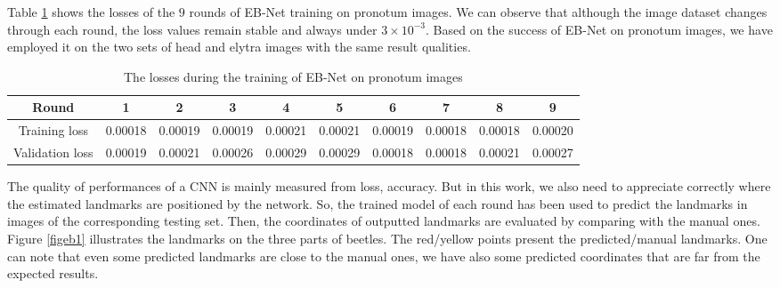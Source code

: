 \documentclass[review]{elsarticle}
\begin{document}
Table \ref{tbltrainingloss} shows the losses of the $9$ rounds of EB-Net training on pronotum images. We can observe that although the image dataset changes through each round, the loss values remain stable and always under $3 \times 10^{-3}$. Based on the success of EB-Net on pronotum images, we have employed it on the two sets of head and elytra images with the same result qualities.

\begin{table}[h!]
	\centering
	\begin{tabular}{| c | c | c | c | c | c | c | c | c | c |}
	\hline
	Round & 1 & 2 & 3 & 4 & 5 & 6 & 7 & 8 & 9 \\ \hline
Training loss & 0.00018 & 0.00019 & 0.00019 & 0.00021 & 0.00021 & 0.00019 & 0.00018 & 0.00018 & 0.00020 \\ \hline
Validation loss & 0.00019 & 0.00021 & 0.00026 & 0.00029 & 0.00029 & 0.00018 & 0.00018 & 0.00021 & 0.00027 \\ \hline
	\end{tabular}
	\caption{The losses during the training of EB-Net on pronotum images}
	\label{tbltrainingloss}
\end{table}

The quality of performances of a CNN is mainly measured from loss, accuracy. But in this work, we also need to appreciate correctly where the estimated landmarks are positioned by the network. So, the trained model of each round has been used to predict the landmarks in images of the corresponding testing set. Then, the coordinates of outputted landmarks are evaluated by comparing with the manual ones. Figure \ref{figeb1} illustrates the landmarks on the three parts of beetles. The red/yellow points present the predicted/manual landmarks. One can note that even some predicted landmarks are close to the manual ones, we have also some predicted coordinates that are far from the expected results.
\end{document}
